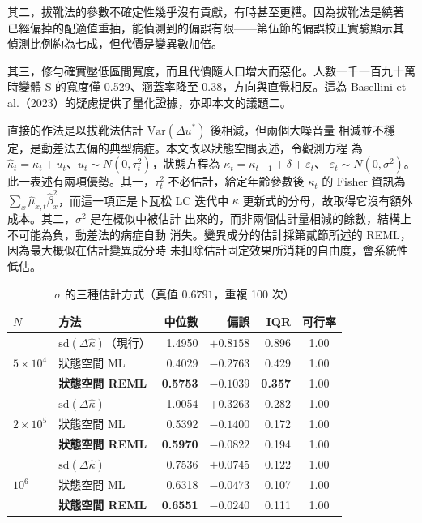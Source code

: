 \documentclass[UTF8, fontset=macnew, a4paper, 12pt]{ctexart}
\begin{document}
其二，拔靴法的參數不確定性幾乎沒有貢獻，有時甚至更糟。因為拔靴法是繞著
已經偏掉的配適值重抽，能偵測到的偏誤有限——第伍節的偏誤校正實驗顯示其
偵測比例約為七成，但代價是變異數加倍。

其三，修勻確實壓低區間寬度，而且代價隨人口增大而惡化。人數一千一百九十萬
時變體 S 的寬度僅 0.529、涵蓋率降至 0.38，方向與直覺相反。這為
Basellini et al.（2023）的疑慮提供了量化證據，亦即本文的議題二。

直接的作法是以拔靴法估計 $\mathrm{Var}(\Delta u^*)$ 後相減，但兩個大噪音量
相減並不穩定，是動差法去偏的典型病症。本文改以狀態空間表述，令觀測方程
為 $\hat\kappa_t=\kappa_t+u_t$、$u_t\sim N(0,\tau_t^2)$，狀態方程為
$\kappa_t=\kappa_{t-1}+\delta+\varepsilon_t$、
$\varepsilon_t\sim N(0,\sigma^2)$。此一表述有兩項優勢。其一，$\tau_t^2$
不必估計，給定年齡參數後 $\kappa_t$ 的 Fisher 資訊為
$\sum_x\hat\mu_{x,t}\hat\beta_x^2$，而這一項正是卜瓦松 LC 迭代中 $\kappa$
更新式的分母，故取得它沒有額外成本。其二，$\sigma^2$ 是在概似中被估計
出來的，而非兩個估計量相減的餘數，結構上不可能為負，動差法的病症自動
消失。變異成分的估計採第貳節所述的 REML，因為最大概似在估計變異成分時
未扣除估計固定效果所消耗的自由度，會系統性低估。

\begin{table}[H]
\centering
\caption{$\sigma$ 的三種估計方式（真值 $0.6791$，重複 100 次）}
\small
\begin{tabular}{llrrrc}
\toprule
$N$ & 方法 & 中位數 & 偏誤 & IQR & 可行率\\
\midrule
\multirow{3}{*}{$5\times10^4$}
 & $\mathrm{sd}(\Delta\hat\kappa)$（現行） & 1.4950 & $+0.8158$ & 0.896 & 1.00\\
 & 狀態空間 ML                             & 0.4029 & $-0.2763$ & 0.429 & 1.00\\
 & \textbf{狀態空間 REML}                  & \textbf{0.5753} & $\mathbf{-0.1039}$ & \textbf{0.357} & 1.00\\
\midrule
\multirow{3}{*}{$2\times10^5$}
 & $\mathrm{sd}(\Delta\hat\kappa)$ & 1.0054 & $+0.3263$ & 0.282 & 1.00\\
 & 狀態空間 ML                     & 0.5392 & $-0.1400$ & 0.172 & 1.00\\
 & \textbf{狀態空間 REML}          & \textbf{0.5970} & $\mathbf{-0.0822}$ & 0.194 & 1.00\\
\midrule
\multirow{3}{*}{$10^6$}
 & $\mathrm{sd}(\Delta\hat\kappa)$ & 0.7536 & $+0.0745$ & 0.122 & 1.00\\
 & 狀態空間 ML                     & 0.6318 & $-0.0473$ & 0.107 & 1.00\\
 & \textbf{狀態空間 REML}          & \textbf{0.6551} & $\mathbf{-0.0240}$ & 0.111 & 1.00\\
\bottomrule
\end{tabular}
\label{tab:sigma}
\end{table}
\end{document}

